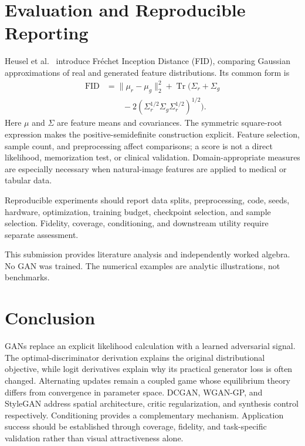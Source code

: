 \documentclass[conference]{IEEEtran}
\begin{document}
\section{Evaluation and Reproducible Reporting}
Heusel et al.~\cite{fid} introduce Fr\'echet Inception Distance (FID), comparing Gaussian approximations of real and generated feature distributions. Its common form is
\begin{align}
\mathrm{FID}&=\|\mu_r-\mu_g\|_2^2+\operatorname{Tr}\big(\Sigma_r+\Sigma_g\nonumber\\
&\qquad-2(\Sigma_r^{1/2}\Sigma_g\Sigma_r^{1/2})^{1/2}\big).
\end{align}
Here $\mu$ and $\Sigma$ are feature means and covariances. The symmetric square-root expression makes the positive-semidefinite construction explicit. Feature selection, sample count, and preprocessing affect comparisons; a score is not a direct likelihood, memorization test, or clinical validation. Domain-appropriate measures are especially necessary when natural-image features are applied to medical or tabular data.

Reproducible experiments should report data splits, preprocessing, code, seeds, hardware, optimization, training budget, checkpoint selection, and sample selection. Fidelity, coverage, conditioning, and downstream utility require separate assessment.

This submission provides literature analysis and independently worked algebra. No GAN was trained. The numerical examples are analytic illustrations, not benchmarks.

\section{Conclusion}
GANs replace an explicit likelihood calculation with a learned adversarial signal. The optimal-discriminator derivation explains the original distributional objective, while logit derivatives explain why its practical generator loss is often changed. Alternating updates remain a coupled game whose equilibrium theory differs from convergence in parameter space. DCGAN, WGAN-GP, and StyleGAN address spatial architecture, critic regularization, and synthesis control respectively. Conditioning provides a complementary mechanism. Application success should be established through coverage, fidelity, and task-specific validation rather than visual attractiveness alone.
\end{document}
